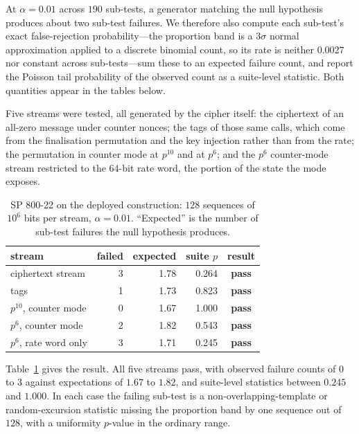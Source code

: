 At $\alpha = 0.01$ across $190$ sub-tests, a generator matching the null
hypothesis produces about two sub-test failures. We therefore also compute each
sub-test's exact false-rejection probability---the proportion band is a
$3\sigma$ normal approximation applied to a discrete binomial count, so its
rate is neither $0.0027$ nor constant across sub-tests---sum these to an
expected failure count, and report the Poisson tail probability of the observed
count as a suite-level statistic. Both quantities appear in the tables below.

Five streams were tested, all generated by the cipher itself: the ciphertext of
an all-zero message under counter nonces; the tags of those same calls, which
come from the finalisation permutation and the key injection rather than from
the rate; the permutation in counter mode at $p^{10}$ and at $p^{6}$; and the
$p^{6}$ counter-mode stream restricted to the $64$-bit rate word, the portion
of the state the mode exposes.

\begin{table}[!t]
\centering
\caption{SP 800-22 on the deployed construction: $128$ sequences of $10^{6}$
bits per stream, $\alpha = 0.01$. ``Expected'' is the number of sub-test
failures the null hypothesis produces.}
\label{tab:sts}
\small
\begin{tabular}{lrrrc}
\hline
stream & failed & expected & suite $p$ & result\\
\hline
ciphertext stream & 3 & 1.78 & 0.264 & \textbf{pass}\\
tags & 1 & 1.73 & 0.823 & \textbf{pass}\\
$p^{10}$, counter mode & 0 & 1.67 & 1.000 & \textbf{pass}\\
$p^{6}$, counter mode & 2 & 1.82 & 0.543 & \textbf{pass}\\
$p^{6}$, rate word only & 3 & 1.71 & 0.245 & \textbf{pass}\\
\hline
\end{tabular}
\end{table}

Table~\ref{tab:sts} gives the result. All five streams pass, with observed
failure counts of $0$ to $3$ against expectations of $1.67$ to $1.82$, and
suite-level statistics between $0.245$ and $1.000$. In each case the failing
sub-test is a non-overlapping-template or random-excursion statistic missing
the proportion band by one sequence out of $128$, with a uniformity $p$-value
in the ordinary range.

